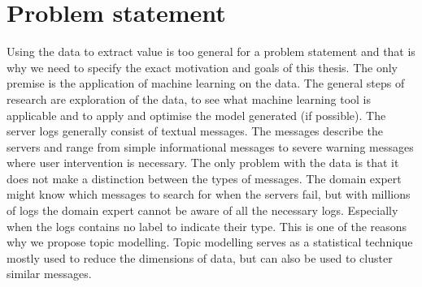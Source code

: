 \begin{comment}
--todo--
The intention of this research started with analysing e system logs to help create a model for predicting hardware and software failure for maintenance and automatic self-healing. The huge amount of system logs available from a variety of systems brought the question how to analyse and make use of the logs to predict hardware and software failure.

Current research of big data makes this a suitable problem to solve through recent machine learning techniques. 
During the time spent on this research challenges were met and identified for realising this goal and ended with the usage of Natural Language Processing (NLP) and unsupervised learning.  The untapped amount of raw data makes it possible for many more application, but in further paragraphs it will be made clear why NLP was chosen and what more could be applied on this Big data problem.

\end{comment}
 
\section{Problem statement}\label{introduction:Motivation}
Using the data to extract value is too general for a problem statement and that is why we need to specify the exact motivation and goals of this thesis. The only premise is the application of machine learning on the data. The general steps of research are exploration of the data, to see what machine learning tool is applicable and to apply and optimise the model generated (if possible). The server logs generally consist of textual messages. The messages describe the servers and range from simple informational messages to severe warning messages where user intervention is necessary. The only problem with the data is that it does not make a distinction between the types of messages. The domain expert might know which messages to search for when the servers fail, but with millions of logs the domain expert cannot be aware of all the necessary logs. Especially when the logs contains no label to indicate their type. This is one of the reasons why we propose topic modelling. Topic modelling serves as a statistical technique mostly used to reduce the dimensions of data, but can also be used to cluster similar messages.

